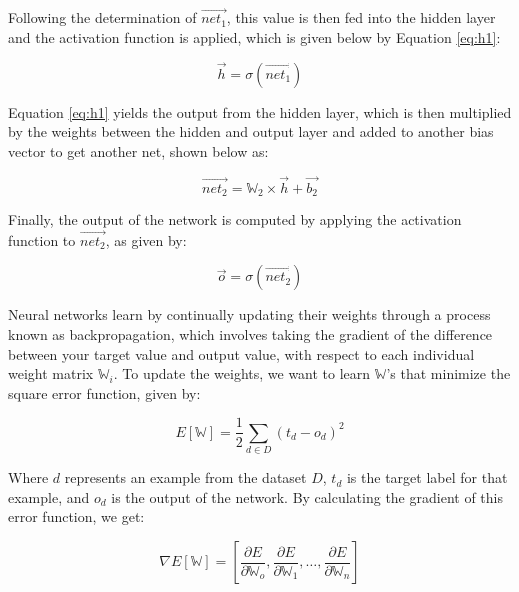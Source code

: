 \documentclass[a4paper]{article}
\begin{document}
Following the determination of $\overrightarrow{net_{1}}$, this value is then fed into the hidden layer and the activation function is applied, which is given below by Equation \ref{eq:h1}:

\begin{equation}
    \label{eq:h1}
    \overrightarrow{h} = \sigma(\overrightarrow{net_{1}})
\end{equation}

Equation \ref{eq:h1} yields the output from the hidden layer, which is then multiplied by the weights between the hidden and output layer and added to another bias vector to get another net, shown below as:

\begin{equation}
    \label{eq:net2}
    \overrightarrow{net_{2}} = \mathbb W_{2} \times \overrightarrow{h} + \overrightarrow{b_2}
\end{equation}

Finally, the output of the network is computed by applying the activation function to $\overrightarrow{net_{2}}$, as given by:

\begin{equation}
    \label{eq:o1}
    \overrightarrow{o} = \sigma(\overrightarrow{net_{2}}) 
\end{equation}

Neural networks learn by continually updating their weights through a process known as backpropagation, which involves taking the gradient of the difference between your target value and output value, with respect to each individual weight matrix $\mathbb W_{i}$. To update the weights, we want to learn $\mathbb W$'s that minimize the square error function, given by:

\begin{equation}
    \label{eq:squarederrorfunction}
    E[\mathbb W] = \frac{1}{2} \sum_{d \in D}(t_d - o_d)^2
\end{equation}

Where $d$ represents an example from the dataset $D$, $t_d$ is the target label for that example, and $o_d$ is the output of the network. By calculating the gradient of this error function, we get:

\begin{equation}
    \label{eq:sqegradient}
    \nabla{E[\mathbb W]} = \left[ \frac{\partial{E}}{\partial{\mathbb W_o}}, \frac{\partial{E}}{\partial{\mathbb W_1}}, \ldots, \frac{\partial{E}}{\partial{\mathbb W_n}} \right]
\end{equation}
\end{document}

